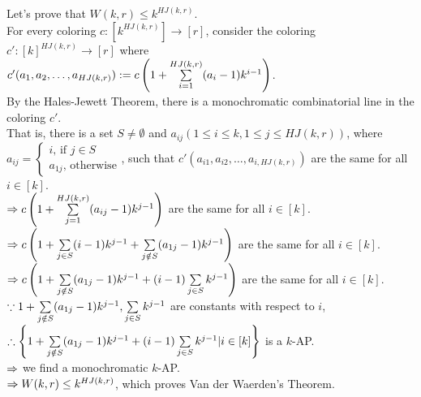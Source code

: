 \begin{pr}
Let's prove that $W(k, r)\leq k^{HJ(k, r)}$.\\
For every coloring $c:[k^{HJ(k, r)}]\to[r]$, consider the coloring $c':[k]^{HJ(k, r)}\to[r]$ where $c'(a_1, a_2, \dots, a_{HJ(k, r)}):=c\left(1+\sum\limits_{i=1}^{HJ(k, r)}(a_i-1)k^{i-1}\right)$.\\
By the Hales-Jewett Theorem, there is a monochromatic combinatorial line in the coloring $c'$.\\
That is, there is a set $S\neq\emptyset$ and $a_{ij}(1\leq i\leq k, 1\leq j\leq HJ(k, r))$, where $a_{ij}=\begin{cases}i\text{, if }j\in S\\a_{1j}\text{, otherwise}\end{cases}$, such that $c'(a_{i1}, a_{i2}, \dots, a_{i, HJ(k, r)})$ are the same for all $i\in[k]$.\\
$\Rightarrow c\left(1+\sum\limits_{j=1}^{HJ(k, r)}(a_{ij}-1)k^{j-1}\right)$ are the same for all $i\in[k]$.\\
$\Rightarrow c\left(1+\sum\limits_{j\in S}(i-1)k^{j-1}+\sum\limits_{j\notin S}(a_{1j}-1)k^{j-1}\right)$ are the same for all $i\in[k]$.\\
$\Rightarrow c\left(1+\sum\limits_{j\notin S}(a_{1j}-1)k^{j-1}+(i-1)\sum\limits_{j\in S}k^{j-1}\right)$ are the same for all $i\in[k]$.\\
$\because1+\sum\limits_{j\notin S}(a_{1j}-1)k^{j-1}, \sum\limits_{j\in S}k^{j-1}$ are constants with respect to $i$,\\
$\therefore\left\{1+\sum\limits_{j\notin S}(a_{1j}-1)k^{j-1}+(i-1)\sum\limits_{j\in S}k^{j-1}|i\in[k]\right\}$ is a $k$-AP.\\
$\Rightarrow$ we find a monochromatic $k$-AP.\\
$\Rightarrow W(k, r)\leq k^{HJ(k, r)}$, which proves Van der Waerden's Theorem.
\end{pr}
